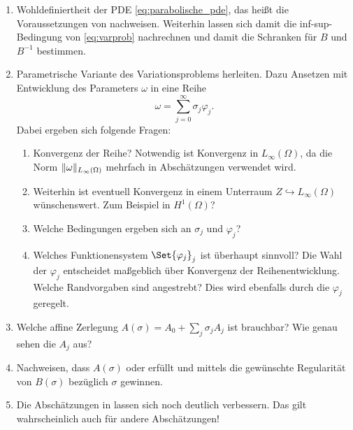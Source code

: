 \begin{enumerate}
    \item Wohldefiniertheit der PDE \eqref{eq:parabolische_pde}, das heißt die Voraussetzungen von  nachweisen. Weiterhin lassen sich damit die inf-sup-Bedingung von \eqref{eq:varprob} nachrechnen und damit die Schranken für $B$ und $B^{-1}$ bestimmen.
    \item Parametrische Variante des Variationsproblems herleiten.
    Dazu Ansetzen mit Entwicklung des Parameters $\omega$ in eine Reihe
    \begin{equation}
        \omega = \sum_{j = 0}^{\infty} \sigma_{j} \varphi_{j}.
    \end{equation}
    Dabei ergeben sich folgende Fragen:
    \begin{enumerate}
        \item Konvergenz der Reihe? Notwendig ist Konvergenz in $L_{\infty}(\Omega)$, da die Norm $\lVert\omega\rVert_{L_{\infty}(\Omega)}$ mehrfach in Abschätzungen verwendet wird.
        \item Weiterhin ist eventuell Konvergenz in einem Unterraum $Z \hookrightarrow L_{\infty}(\Omega)$ wünschenswert.
        Zum Beispiel in $H^{1}(\Omega)$?
        \item Welche Bedingungen ergeben sich an $\sigma_{j}$ und $\varphi_{j}$?
        \item Welches Funktionensystem $\Set{ \varphi_{j} }_{j}$ ist überhaupt sinnvoll?
        Die Wahl der $\varphi_{j}$ entscheidet maßgeblich über Konvergenz der Reihenentwicklung.
        Welche Randvorgaben sind angestrebt?
        Dies wird ebenfalls durch die $\varphi_{j}$ geregelt.
    \end{enumerate}
    \item Welche affine Zerlegung $A(\sigma) = A_{0} + \sum_{j} \sigma_{j} A_{j}$ ist brauchbar?
    Wie genau sehen die $A_{j}$ aus?
    \item Nachweisen, dass $A(\sigma)$  oder  erfüllt und mittels  die gewünschte Regularität von $B(\sigma)$ bezüglich $\sigma$ gewinnen.
    \item Die Abschätzungen in  lassen sich noch deutlich verbessern.
    Das gilt wahrscheinlich auch für andere Abschätzungen!
\end{enumerate}

